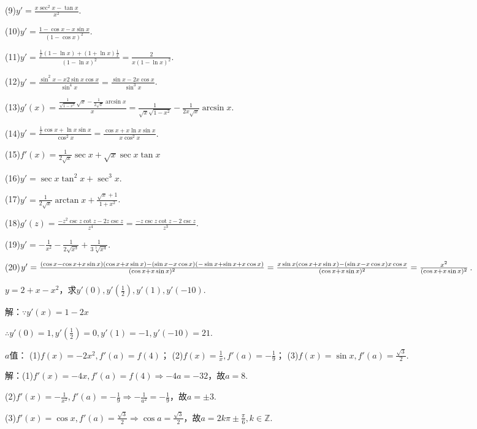 \documentclass[12pt,UTF8]{ctexart}
\begin{document}
\begin{enumerate}
(9)$y'=\frac{x\sec^2x-\tan x}{x^2}$.

(10)$y'=\frac{1-\cos x-x\sin x}{(1-\cos x)^2}$.

(11)$y'=\frac{\frac1x(1-\ln x)+(1+\ln x)\frac1x}{(1-\ln x)^2}=\frac2{x(1-\ln x)^2}$.

(12)$y'=\frac{\sin^2x-x2\sin x\cos x}{\sin^4x}=\frac{\sin x-2x\cos x}{\sin^3x}$.

(13)$g'(x)=\frac{\frac1{\sqrt{1-x^2}}\sqrt x-\frac1{2\sqrt x}\arcsin x}{x}=\frac1{\sqrt x\sqrt{1-x^2}}-\frac1{2x\sqrt x}\arcsin x$.

(14)$y'=\frac{\frac1x\cos x+\ln x\sin x}{\cos^2x}=\frac{\cos x+x\ln x\sin x}{x\cos^2x}$.

(15)$f'(x)=\frac1{2\sqrt x}\sec x+\sqrt x\sec x\tan x$

(16)$y'=\sec x\tan^2x+\sec^3x$.

(17)$y'=\frac1{2\sqrt x}\arctan x+\frac{\sqrt x+1}{1+x^2}$.

(18)$g'(z)=\frac{-z^2\csc z\cot z-2z\csc z}{z^4}=\frac{-z\csc z\cot z-2\csc z}{z^3}$.

(19)$y'=-\frac1{x^2}-\frac1{2\sqrt{x^3}}+\frac1{3\sqrt[3]{x^4}}$.

(20)$y'=\frac{(\cos x-\cos x+x\sin x)(\cos x+x\sin x)-(\sin x-x\cos x)(-\sin x+\sin x+x\cos x)}{(\cos x+x\sin x)^2}
\\=\frac{x\sin x(\cos x+x\sin x)-(\sin x-x\cos x)x\cos x}{(\cos x+x\sin x)^2}=\frac{x^2}{(\cos x+x\sin x)^2}$.

$y=2+x-x^2$，求$y'(0),y'(\frac12),y'(1),y'(-10)$.

解：$\because y'(x)=1-2x$

$\therefore y'(0)=1,y'(\frac12)=0,y'(1)=-1,y'(-10)=21$.

$a$值：
\newline
(1)$f(x)=-2x^2,f'(a)=f(4)$；
\newline
(2)$f(x)=\frac1x,f'(a)=-\frac19$；
\newline
(3)$f(x)=\sin x,f'(a)=\frac{\sqrt3}2$.

解：(1)$f'(x)=-4x,f'(a)=f(4)\Rightarrow -4a=-32$，故$a=8$.

(2)$f'(x)=-\frac1{x^2},f'(a)=-\frac19\Rightarrow -\frac1{a^2}=-\frac19$，故$a=\pm3$.

(3)$f'(x)=\cos x,f'(a)=\frac{\sqrt3}2\Rightarrow\cos a=\frac{\sqrt3}2$，故$a=2k\pi\pm\frac\pi6,k\in\mathbb Z$.


\end{enumerate}
\end{document}
